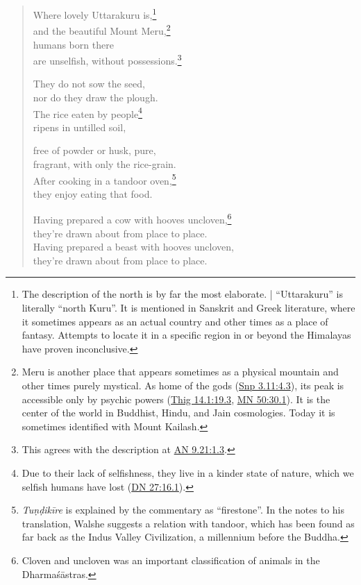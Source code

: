 \documentclass[12pt,openany]{book}%
\begin{document}
\begin{verse}
Where lovely Uttarakuru is,\footnote{The description of the north is by far the most elaborate. | “Uttarakuru” is literally “north Kuru”. It is mentioned in Sanskrit and Greek literature, where it sometimes appears as an actual country and other times as a place of fantasy. Attempts to locate it in a specific region in or beyond the Himalayas have proven inconclusive. } \\
and the beautiful Mount Meru,\footnote{Meru is another place that appears sometimes as a physical mountain and other times purely mystical. As home of the gods (\href{https://suttacentral.net/snp3.11/en/sujato\#4.3}{Snp 3.11:4.3}), its peak is accessible only by psychic powers (\href{https://suttacentral.net/thig14.1/en/sujato\#19.3}{Thig 14.1:19.3}, \href{https://suttacentral.net/mn50/en/sujato\#30.1}{MN 50:30.1}). It is the center of the world in Buddhist, Hindu, and Jain cosmologies. Today it is sometimes identified with Mount Kailash. } \\
humans born there \\
are unselfish, without possessions.\footnote{This agrees with the description at \href{https://suttacentral.net/an9.21/en/sujato\#1.3}{AN 9.21:1.3}. } 

They do not sow the seed, \\
nor do they draw the plough. \\
The rice eaten by people\footnote{Due to their lack of selfishness, they live in a kinder state of nature, which we selfish humans have lost (\href{https://suttacentral.net/dn27/en/sujato\#16.1}{DN 27:16.1}). } \\
ripens in untilled soil, 

free of powder or husk, pure, \\
fragrant, with only the rice-grain. \\
After cooking in a tandoor oven,\footnote{\textit{\textsanskrit{Tuṇḍikīre}} is explained by the commentary as “firestone”. In the notes to his translation, Walshe suggests a relation with tandoor, which has been found as far back as the Indus Valley Civilization, a millennium before the Buddha. } \\
they enjoy eating that food. 

Having prepared a cow with hooves uncloven,\footnote{Cloven and uncloven was an important classification of animals in the \textsanskrit{Dharmaśāstras}. } \\
they’re drawn about from place to place. \\
Having prepared a beast with hooves uncloven, \\
they’re drawn about from place to place. 


\end{verse}
\end{document}
